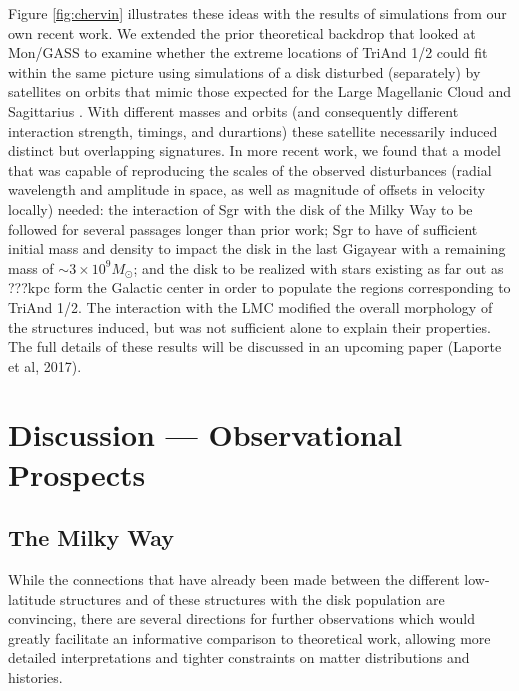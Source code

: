 \documentclass[galaxies,article,submit,moreauthors,pdftex,10pt,a4paper]{mdpi}
\begin{document}
Figure \ref{fig:chervin} illustrates these ideas with the results of simulations from our own recent work.
We extended the prior theoretical backdrop that looked at Mon/GASS to examine whether the extreme locations of TriAnd 1/2 could fit within the same picture using simulations of a disk disturbed (separately) by satellites on orbits that mimic those expected for the Large Magellanic Cloud and Sagittarius \cite{laporte17}.
With different masses and orbits (and consequently different interaction  strength, timings, and durartions) these satellite necessarily induced distinct but overlapping signatures.
In  more recent work, we found that a model that was capable of reproducing the scales of the observed disturbances (radial wavelength and  amplitude in space, as well as magnitude of offsets in velocity locally) needed:
the  interaction of Sgr with the disk of the Milky Way to be followed for several passages longer than prior work;
Sgr to have of sufficient initial mass and density to impact the disk in the last Gigayear with a remaining mass of $\sim3\times10^{9} M_{\odot}$;
and the disk to be realized with stars existing as far out as ???kpc form the Galactic center in order to populate the regions corresponding to TriAnd 1/2.
The interaction with the LMC modified the overall morphology of the structures induced, but was not sufficient alone to explain their properties.
The full details of these results will be discussed in an upcoming paper (Laporte et al, 2017).

\section{Discussion --- Observational Prospects}

\subsection{The Milky Way}

While the connections that have already been made between the different low-latitude structures and of these structures with the disk population are convincing, there are several directions for further observations which would greatly facilitate an informative comparison to theoretical work, allowing more detailed interpretations and tighter constraints on matter distributions and histories.
\end{document}
